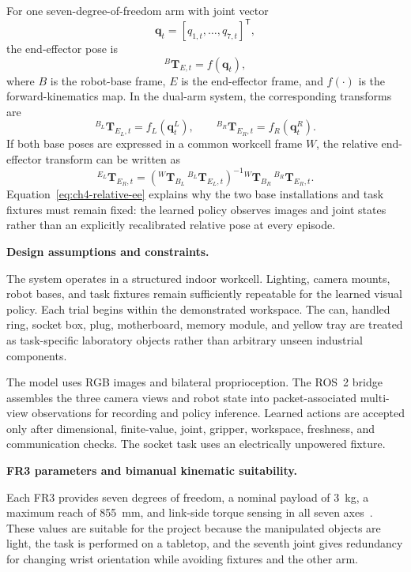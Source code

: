 For one seven-degree-of-freedom arm with joint vector
\[
\mathbf q_t=[q_{1,t},\ldots,q_{7,t}]^{\mathsf T},
\]
the end-effector pose is
\begin{equation}
{}^{B}\mathbf T_{E,t}=f(\mathbf q_t),
\label{eq:ch4-single-arm-fk}
\end{equation}
where \(B\) is the robot-base frame, \(E\) is the end-effector frame, and \(f(\cdot)\) is the forward-kinematics map. In the dual-arm system, the corresponding transforms are
\begin{equation}
{}^{B_L}\mathbf T_{E_L,t}=f_L(\mathbf q^L_t),
\qquad
{}^{B_R}\mathbf T_{E_R,t}=f_R(\mathbf q^R_t).
\label{eq:ch4-dual-arm-fk}
\end{equation}
If both base poses are expressed in a common workcell frame \(W\), the relative end-effector transform can be written as
\begin{equation}
{}^{E_L}\mathbf T_{E_R,t}
=
\left({}^{W}\mathbf T_{B_L}\,{}^{B_L}\mathbf T_{E_L,t}\right)^{-1}
{}^{W}\mathbf T_{B_R}\,{}^{B_R}\mathbf T_{E_R,t}.
\label{eq:ch4-relative-ee}
\end{equation}
Equation~\ref{eq:ch4-relative-ee} explains why the two base installations and task fixtures must remain fixed: the learned policy observes images and joint states rather than an explicitly recalibrated relative pose at every episode.

\medskip
\noindent\textbf{Design assumptions and constraints.}

The system operates in a structured indoor workcell. Lighting, camera mounts, robot bases, and task fixtures remain sufficiently repeatable for the learned visual policy. Each trial begins within the demonstrated workspace. The can, handled ring, socket box, plug, motherboard, memory module, and yellow tray are treated as task-specific laboratory objects rather than arbitrary unseen industrial components.

The model uses RGB images and bilateral proprioception. The ROS~2 bridge assembles the three camera views and robot state into packet-associated multi-view observations for recording and policy inference. Learned actions are accepted only after dimensional, finite-value, joint, gripper, workspace, freshness, and communication checks. The socket task uses an electrically unpowered fixture.

\medskip
\noindent\textbf{FR3 parameters and bimanual kinematic suitability.}

Each FR3 provides seven degrees of freedom, a nominal payload of 3~kg, a maximum reach of 855~mm, and link-side torque sensing in all seven axes~\cite{fr3datasheet,fr3product,frankafci}. These values are suitable for the project because the manipulated objects are light, the task is performed on a tabletop, and the seventh joint gives redundancy for changing wrist orientation while avoiding fixtures and the other arm.

